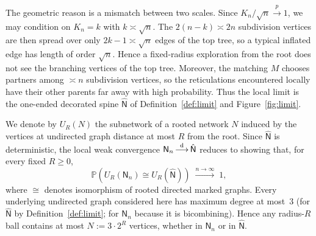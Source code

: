 \documentclass[english,11pt]{smfart}
\newcommand{\Prb}[1]{\mathbb{P}\left(#1\right)}
\newcommand{\convdis}{\,{\buildrel \mathrm{d} \over \longrightarrow}\,}
\newcommand{\mN}{\mathsf{N}}
\newtheorem{theorem}{Theorem}[section]
\numberwithin{equation}{section}
\begin{document}
The geometric reason is a mismatch between two scales. Since
\(K_n/\sqrt n \stackrel{p}{\to}1\), we may condition on \(K_n=k\) with
\(k\asymp\sqrt n\). The \(2(n-k)\asymp 2n\) subdivision vertices are then spread
over only \(2k-1\asymp\sqrt n\) edges of the top tree, so a typical inflated
edge has length of order \(\sqrt n\). Hence a fixed-radius exploration from the
root does not see the branching vertices of the top tree. Moreover, the
matching \(M\) chooses partners among \(\asymp n\) subdivision vertices, so the
reticulations encountered locally have their other parents far away with high
probability. Thus the local limit is the one-ended decorated spine
\(\hat{\mN}\) of Definition~\ref{def:limit} and Figure~\ref{fig:limit}.
\smallskip


We denote by $U_R(N)$ the subnetwork of a rooted network $N$ induced by the
vertices at undirected graph distance at most $R$ from the root. Since
$\hat{\mN}$ is deterministic, the local weak convergence
$\mN_n\convdis\hat{\mN}$ reduces to showing that, for every fixed $R\ge 0$,
\begin{equation}\label{eq:crit}
  \Prb{U_R(\mN_n)\cong U_R(\hat{\mN})}\;\xrightarrow{n\to\infty}\;1,
\end{equation}
where $\cong$ denotes isomorphism of rooted directed marked graphs. Every underlying undirected graph considered here has maximum degree at
most~$3$ (for $\hat{\mN}$ by Definition~\ref{def:limit}; for $\mN_n$ because
it is bicombining). Hence any radius-$R$ ball contains at most
$N:=3\cdot 2^R$ vertices, whether in $\mN_n$ or in $\hat{\mN}$.
\end{document}

